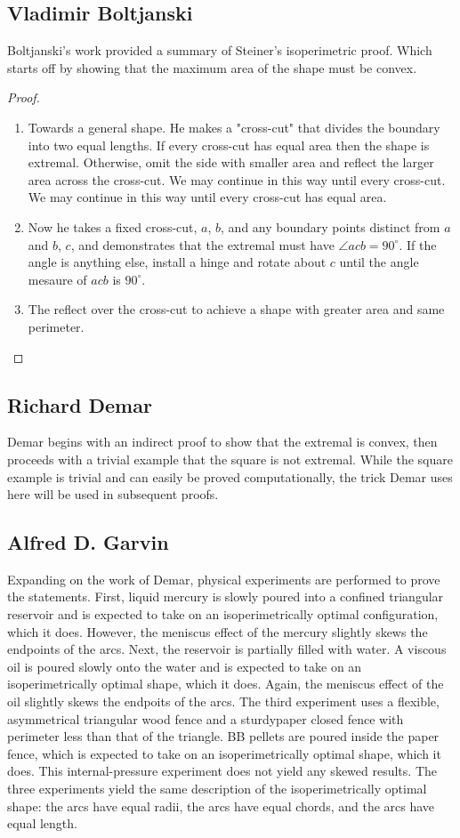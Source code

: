 \documentclass[a4paper]{book}
\begin{document}
\subsection{Vladimir Boltjanski}
Boltjanski's work provided a summary of Steiner's isoperimetric proof. Which starts off by showing that the maximum area of the shape must be convex.
\begin{proof}
	\begin{enumerate}
		\item Towards a general shape. He makes a "cross-cut" that divides the boundary into two equal lengths. If every cross-cut has equal area then the shape is extremal. Otherwise, omit the side with smaller area and reflect the larger area across the cross-cut. We may continue in this way until every cross-cut. We may continue in this way until every cross-cut has equal area.
		\item Now  he takes a fixed cross-cut, $a$, $b$, and any boundary points distinct from $a$ and $b$, $c$, and demonstrates that the extremal must have $\angle acb=90^{\circ}$. If the angle is anything else, install a hinge and rotate about $c$ until the angle mesaure of $acb$ is $90^{\circ}$.
		\item The reflect over the cross-cut to achieve a shape with greater area and same perimeter.
	\end{enumerate}
\end{proof}

\subsection{Richard Demar}
Demar begins with an indirect proof to show that the extremal is convex, then proceeds with a trivial example that the square is not extremal. While the square example is trivial and can easily be proved computationally, the trick Demar uses here will be used in subsequent proofs.

\subsection{Alfred D. Garvin}
Expanding on the work of Demar, physical experiments are performed to prove the statements. First, liquid mercury is slowly poured into a confined triangular reservoir and is expected to take on an isoperimetrically optimal configuration, which it does. However, the meniscus effect of the mercury slightly skews the endpoints of the arcs. Next, the reservoir is partially filled with water. A viscous oil is poured slowly onto the water and is expected to take on an isoperimetrically optimal shape, which it does. Again, the meniscus effect of the oil slightly skews the endpoits of the arcs. The third experiment uses a flexible, asymmetrical triangular wood fence and a sturdypaper closed fence with perimeter less than that of the triangle. BB pellets are poured inside the paper fence, which is expected to take on an isoperimetrically optimal shape, which it does. This internal-pressure experiment does not yield any skewed results. The three experiments yield the same description of the isoperimetrically optimal shape: the arcs have equal radii, the arcs have equal chords, and the arcs have equal length.
\end{document}
